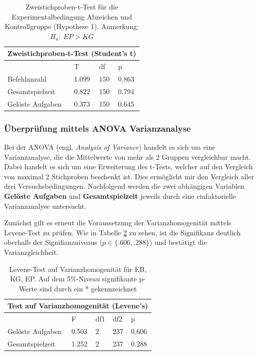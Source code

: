 \begin{table}[htbp]
\centering
\begin{tabular}{ |p{4cm}||p{2.0cm}|p{2.0cm}|p{2.0cm}| }
 \hline
 \multicolumn{4}{|c|}{Zweistichproben-t-Test (Student's t)} \\
 \hline
 & T &df & p \\
 \hline
  Befehlanzahl       & 1.099   &   150 & 0.863\\
  Gesamtspielzeit    & 0.822   &   150 & 0.794\\
  Gelöste Aufgaben   & 0.373   &   150 & 0.645\\
 \hline
\end{tabular}
\caption{Zweistichproben-t-Test für die Experimentalbedingung Abzeichen und Kontrollgruppe (Hypothese 1). Anmerkung: $H_a:\: EP > KG$}
\label{ttest_hypo_2}
\end{table}

\subsubsection{Überprüfung mittels ANOVA Varianzanalyse }
Bei der ANOVA (engl. \textit{Analysis of Variance}) handelt es sich um eine Varianzanalyse, die die Mittelwerte von mehr als 2 Gruppen vergleichbar macht. Dabei handelt es sich um eine Erweiterung des t-Tests, welcher auf den Vergleich von maximal 2 Stichproben beschenkt ist. Dies ermöglicht mir den Vergleich aller drei Versuchsbedingungen. Nachfolgend werden die zwei abhängigen Variablen \textbf{Gelöste Aufgaben} und \textbf{Gesamtspielzeit} jeweils durch eine einfaktorielle Varianzanalyse untersucht.

Zunächst gilt es erneut die Voraussetzung der Varianzhomogenität mittels Levene-Test zu prüfen. Wie in Tabelle \ref{levene_amova} zu sehen, ist die Signifikanz deutlich oberhalb der Signifianzniveaus ($p\in \{.606, .288\}$) und bestätigt die Varianzgleichheit.

\begin{table}[htbp]
\centering
\begin{tabular}{ |p{4cm}||p{2.0cm}|p{2.0cm}|p{2.0cm}|p{2.0cm}| }
 \hline
 \multicolumn{5}{|c|}{Test auf Varianzhomogenität (Levene's)} \\
 \hline
 & F & df1 &df2 &p \\
 \hline
  Gelöste Aufgaben      & 0.503     & 2 &   237 & 0.606\\
  Gesamtspielzeit       & 1.252     & 2 &   237 & 0.288\\
 \hline
\end{tabular}
\caption{Levene-Test auf Varianzhomogenität für EB, KG, EP. Auf dem 5\%-Niveau signifikante p-Werte sind durch ein * gekennzeichnet}
\label{levene_amova}
\end{table}

